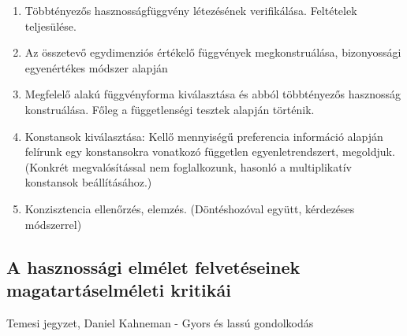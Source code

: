 \documentclass[a4paper,12pt]{article}
\begin{document}
\begin{enumerate}
\item Többtényezős hasznosságfüggvény létezésének verifikálása. Feltételek teljesülése.
\item Az összetevő egydimenziós értékelő függvények megkonstruálása, bizonyossági egyenértékes módszer alapján
\item Megfelelő alakú függvényforma kiválasztása és abból többtényezős hasznosság konstruálása. Főleg a függetlenségi tesztek alapján történik.
\item Konstansok kiválasztása: Kellő mennyiségű preferencia információ alapján felírunk egy konstansokra vonatkozó független egyenletrendszert, megoldjuk. (Konkrét megvalósítással nem foglalkozunk, hasonló a multiplikatív konstansok beállításához.)
\item Konzisztencia ellenőrzés, elemzés. (Döntéshozóval együtt, kérdezéses módszerrel)
\end{enumerate}

\subsection{A hasznossági elmélet felvetéseinek magatartáselméleti kritikái}

Temesi jegyzet, Daniel Kahneman - Gyors és lassú gondolkodás

\end{document}
